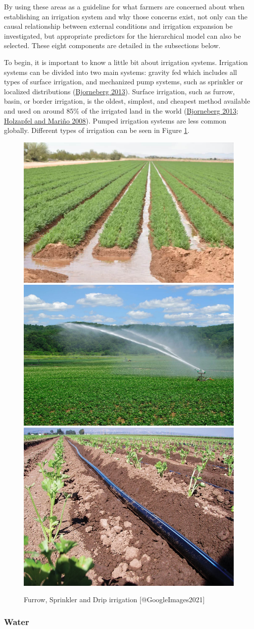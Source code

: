 \documentclass[12pt,twoside]{reedthesis}
\begin{document}
By using these areas as a guideline for what farmers are concerned about when establishing an irrigation system and why those concerns exist, not only can the causal relationship between external conditions and irrigation expansion be investigated, but appropriate predictors for the hierarchical model can also be selected. These eight components are detailed in the subsections below.

To begin, it is important to know a little bit about irrigation systems. Irrigation systems can be divided into two main systems: gravity fed which includes all types of surface irrigation, and mechanized pump systems, such as sprinkler or localized distributions (\protect\hyperlink{ref-bjornebergIRRIGATIONMethods2013}{Bjorneberg 2013}). Surface irrigation, such as furrow, basin, or border irrigation, is the oldest, simplest, and cheapest method available and used on around 85\% of the irrigated land in the world (\protect\hyperlink{ref-bjornebergIRRIGATIONMethods2013}{Bjorneberg 2013}; \protect\hyperlink{ref-holzapfelIrrigationAgriculture2008}{Holzapfel and Mariño 2008}). Pumped irrigation systems are less common globally. Different types of irrigation can be seen in Figure \ref{fig:irrigationtypes}.
\begin{figure}

{\centering \includegraphics[width=0.3\linewidth,height=0.2\textheight]{figure/FurrowPic} \includegraphics[width=0.3\linewidth,height=0.2\textheight]{figure/Irrigation-sprinklers} \includegraphics[width=0.3\linewidth,height=0.2\textheight]{figure/DripIrrigation} 

}

\caption{Furrow, Sprinkler and Drip irrigation  [@GoogleImages2021]}\label{fig:irrigationtypes}
\end{figure}
\hypertarget{water}{%
\subsubsection{Water}\label{water}}
\end{document}
